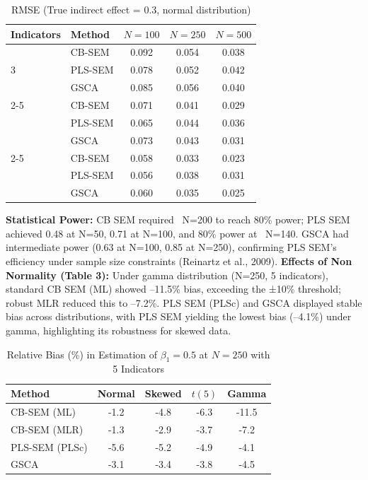 \documentclass[twoside]{article}
\begin{document}
\begin{table}[H]
	\centering
	\caption{RMSE (True indirect effect = 0.3, normal distribution)}
	\label{tab:rmse}
	\begin{tabular}{llccc}
		\toprule
		\textbf{Indicators} & \textbf{Method} & \textbf{$N=100$} & \textbf{$N=250$} & \textbf{$N=500$} \\
		\midrule
		\multirow{3}{*}{3} & CB-SEM   & 0.092 & 0.054 & 0.038 \\
		& PLS-SEM  & 0.078 & 0.052 & 0.042 \\
		& GSCA     & 0.085 & 0.056 & 0.040 \\
		\cmidrule{2-5}
		\multirow{3}{*}{5} & CB-SEM   & 0.071 & 0.041 & 0.029 \\
		& PLS-SEM  & 0.065 & 0.044 & 0.036 \\
		& GSCA     & 0.073 & 0.043 & 0.031 \\
		\cmidrule{2-5}
		\multirow{3}{*}{7} & CB-SEM   & 0.058 & 0.033 & 0.023 \\
		& PLS-SEM  & 0.056 & 0.038 & 0.031 \\
		& GSCA     & 0.060 & 0.035 & 0.025 \\
		\bottomrule
	\end{tabular}
\end{table}

\textbf{Statistical Power:} CB SEM required ~N=200 to reach 80\% power; PLS SEM achieved 0.48 at N=50, 0.71 at N=100, and 80\% power at ~N=140. GSCA had intermediate power (0.63 at N=100, 0.85 at N=250), confirming PLS SEM’s efficiency under sample size constraints (Reinartz et al., 2009).
\textbf{Effects of Non Normality (Table 3):} Under gamma distribution (N=250, 5 indicators), standard CB SEM (ML) showed –11.5\% bias, exceeding the ±10\% threshold; robust MLR reduced this to –7.2\%. PLS SEM (PLSc) and GSCA displayed stable bias across distributions, with PLS SEM yielding the lowest bias (–4.1\%) under gamma, highlighting its robustness for skewed data.

\begin{table}[H]
	\centering
	\caption{Relative Bias (\%) in Estimation of $\beta_1 = 0.5$ at $N = 250$ with 5 Indicators}
	\label{tab:bias}
	\begin{tabular}{lcccc}
		\toprule
		\textbf{Method} & \textbf{Normal} & \textbf{Skewed} & \textbf{$t(5)$} & \textbf{Gamma} \\
		\midrule
		CB-SEM (ML)       & -1.2 & -4.8 & -6.3 & -11.5 \\
		CB-SEM (MLR)      & -1.3 & -2.9 & -3.7 & -7.2 \\
		PLS-SEM (PLSc)    & -5.6 & -5.2 & -4.9 & -4.1 \\
		GSCA              & -3.1 & -3.4 & -3.8 & -4.5 \\
		\bottomrule
	\end{tabular}
\end{table}
\end{document}
